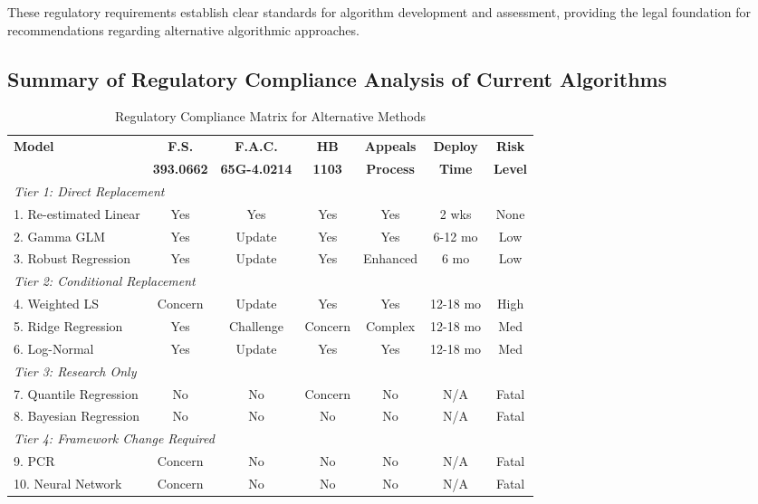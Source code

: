 These regulatory requirements establish clear standards for algorithm development and assessment, providing the legal foundation for recommendations regarding alternative algorithmic approaches.

\subsection{Summary of Regulatory Compliance Analysis of Current Algorithms}

\begin{table}[h]
\centering
\caption{Regulatory Compliance Matrix for Alternative Methods}
\label{tab:compliance}
\begin{tabular}{lcccccc}
\hline
\textbf{Model} & \textbf{F.S.} & \textbf{F.A.C.} & \textbf{HB} & \textbf{Appeals} & \textbf{Deploy} & \textbf{Risk} \\
 & \textbf{393.0662} & \textbf{65G-4.0214} & \textbf{1103} & \textbf{Process} & \textbf{Time} & \textbf{Level} \\
\hline
\multicolumn{7}{l}{\textit{Tier 1: Direct Replacement}} \\
1. Re-estimated Linear & Yes & Yes & Yes & Yes & 2 wks & None \\
2. Gamma GLM & Yes & Update & Yes & Yes & 6-12 mo & Low \\
3. Robust Regression & Yes & Update & Yes & Enhanced & 6 mo & Low \\
\hline
\multicolumn{7}{l}{\textit{Tier 2: Conditional Replacement}} \\
4. Weighted LS & Concern & Update & Yes & Yes & 12-18 mo & High \\
5. Ridge Regression & Yes & Challenge & Concern & Complex & 12-18 mo & Med \\
6. Log-Normal & Yes & Update & Yes & Yes & 12-18 mo & Med \\
\hline
\multicolumn{7}{l}{\textit{Tier 3: Research Only}} \\
7. Quantile Regression & No & No & Concern & No & N/A & Fatal \\
8. Bayesian Regression & No & No & No & No & N/A & Fatal \\
\hline
\multicolumn{7}{l}{\textit{Tier 4: Framework Change Required}} \\
9. PCR & Concern & No & No & No & N/A & Fatal \\
10. Neural Network & Concern & No & No & No & N/A & Fatal \\
\hline
\end{tabular}
\end{table}

